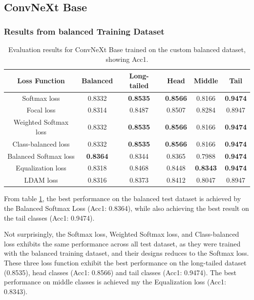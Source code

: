 \subsection{ConvNeXt Base}

\subsubsection{Results from balanced Training Dataset}

\begin{table}[h!]
    \centering
    \caption{Evaluation results for ConvNeXt Base trained on the custom balanced dataset, showing Acc1.}
    \begin{tabular}{cccccc}
        \toprule
        Loss Function & Balanced & Long-tailed & Head & Middle & Tail \\ 
        \midrule
        Softmax loss   & 0.8332 & \textbf{0.8535} & \textbf{0.8566} & 0.8166 & \textbf{0.9474} \\
        Focal loss   & 0.8314 & 0.8487 & 0.8507 & 0.8284 & 0.8947 \\
        Weighted Softmax loss   & 0.8332 & \textbf{0.8535} & \textbf{0.8566} &  0.8166 & \textbf{0.9474} \\
        Class-balanced loss   & 0.8332 & \textbf{0.8535} & \textbf{0.8566} & 0.8166 & \textbf{0.9474} \\
        Balanced Softmax loss   & \textbf{0.8364} & 0.8344 & 0.8365 & 0.7988 & \textbf{0.9474} \\
        Equalization loss   & 0.8318 & 0.8468 & 0.8448 & \textbf{0.8343} & \textbf{0.9474} \\
        LDAM loss   & 0.8316 & 0.8373 & 0.8412 & 0.8047 & 0.8947 \\
        \bottomrule
    \end{tabular}
    \label{tab:conv_bal_acc1_1}
\end{table}

From table \ref{tab:conv_bal_acc1_1}, the best performance on the balanced test dataset is achieved by the Balanced Softmax Loss (Acc1: 0.8364), while also achieving the best result on the tail classes (Acc1: 0.9474).

Not surprisingly, the Softmax loss, Weighted Softmax loss, and Class-balanced loss exhibits the same performance across all test dataset, as they were trained with the balanced training dataset, and their designs reduces to the Softmax loss. These three loss function exhibit the best performance on the long-tailed dataset (0.8535), head classes (Acc1: 0.8566) and tail classes (Acc1: 0.9474). The best performance on middle classes is achieved my the Equalization loss (Acc1: 0.8343).

